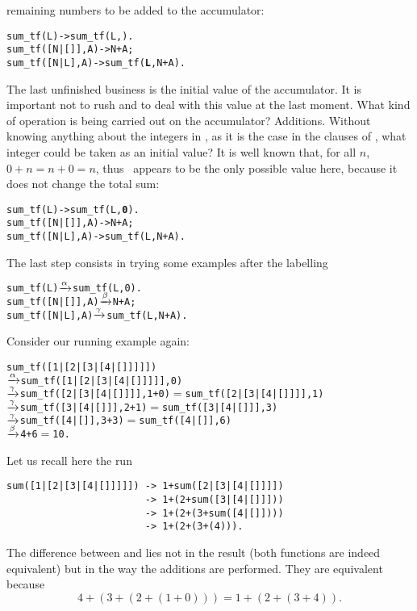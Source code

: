 remaining numbers to be added to the accumulator:
\begin{alltt}
sum_tf(L)        -> sum_tf(L,).
sum_tf([N|[]],A) -> N+A;
sum_tf([N| L],A) -> sum_tf(\textbf{L},N+A).
\end{alltt}
The last unfinished business is the initial value of the
accumulator. It is important not to rush and to deal with this value
at the last moment. What kind of operation is being carried out on the
accumulator? Additions. Without knowing anything about the integers in
, as it is the case in the clauses of ,
what integer could be taken as an initial value? It is well known
that, for all \(n\), \(0 + n = n + 0 = n\), thus ~appears
to be the only possible value here, because it does not change the
total sum:
\begin{alltt}
sum_tf(L)        -> sum_tf(L,\textbf{0}).
sum_tf([N|[]],A) -> N+A;
sum_tf([N| L],A) -> sum_tf(L,N+A).
\end{alltt}
The last step consists in trying some examples after the labelling
\begin{alltt}
sum_tf(L)        \(\xrightarrow{\smash[t]{\alpha}}\) sum_tf(L,0).
sum_tf([N|[]],A) \(\xrightarrow{\smash[t]{\beta}}\) N+A;
sum_tf([N| L],A) \(\xrightarrow{\smash[t]{\gamma}}\) sum_tf(L,N+A).
\end{alltt}
Consider our running example again:
\begin{alltt}
sum\_tf([1|[2|[3|[4|[]]]]])
  \(\xrightarrow{\smash[t]{\alpha}}\) sum\_tf([1|[2|[3|[4|[]]]]],0)
  \(\xrightarrow{\smash[t]{\gamma}}\) sum\_tf([2|[3|[4|[]]]],1+0) \(=\) sum\_tf([2|[3|[4|[]]]],1)
  \(\xrightarrow{\smash[t]{\gamma}}\) sum\_tf([3|[4|[]]],2+1)     \(=\) sum\_tf([3|[4|[]]],3)
  \(\xrightarrow{\smash[t]{\gamma}}\) sum\_tf([4|[]],3+3)         \(=\) sum\_tf([4|[]],6)
  \(\xrightarrow{\smash[t]{\beta}}\)  4 + 6                     \(=\) 10\textrm{.}
\end{alltt}
Let us recall here the run
\begin{verbatim}
sum([1|[2|[3|[4|[]]]]]) -> 1+sum([2|[3|[4|[]]]])
                        -> 1+(2+sum([3|[4|[]]]))
                        -> 1+(2+(3+sum([4|[]])))
                        -> 1+(2+(3+(4))).
\end{verbatim}
The difference between  and  lies
not in the result (both functions are indeed equivalent) but in the
way the additions are performed. They are equivalent because
\begin{equation*}
4 + (3 + (2 + (1 + 0))) = 1 + (2 + (3 + 4)).
\end{equation*}
